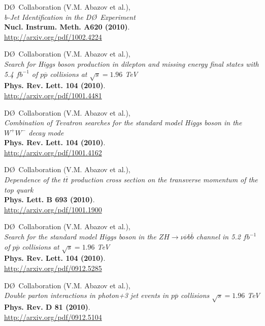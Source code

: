 \documentclass[12pt]{article}
\begin{document}
%
D\O~Collaboration (V.M. Abazov et al.), \\
\textsl{b-Jet Identification in the D\O~Experiment}\\
\textbf{Nucl. Instrum. Meth. A620 (2010)}.\\
{\small{\url{http://arxiv.org/pdf/1002.4224}}}\vspace{4mm}

%
D\O~Collaboration (V.M. Abazov et al.), \\
\textsl{Search for Higgs boson production in dilepton and missing energy final states with 5.4 $fb^{-1}$ of $p\overline{p}$ collisions at $\sqrt{s}=1.96$ TeV}\\
\textbf{Phys. Rev. Lett. 104 (2010)}.\\
{\small{\url{http://arxiv.org/pdf/1001.4481}}}\vspace{4mm}

%
D\O~Collaboration (V.M. Abazov et al.), \\
\textsl{Combination of Tevatron searches for the standard model Higgs boson in the $W^{+}W^{-}$ decay mode}\\
\textbf{Phys. Rev. Lett. 104 (2010)}.\\
{\small{\url{http://arxiv.org/pdf/1001.4162}}}\vspace{4mm}

%
D\O~Collaboration (V.M. Abazov et al.), \\
\textsl{Dependence of the $t\overline{t}$ production cross section on the transverse momentum of the top quark}\\
\textbf{Phys. Lett. B 693 (2010)}.\\
{\small{\url{http://arxiv.org/pdf/1001.1900}}}\vspace{4mm}

%
D\O~Collaboration (V.M. Abazov et al.), \\
\textsl{Search for the standard model Higgs boson in the $ZH\rightarrow \nu\overline{\nu}b\overline{b}$ channel in 5.2 $fb^{-1}$ of $p\overline{p}$ collisions at $\sqrt{s}=1.96$ TeV}\\
\textbf{Phys. Rev. Lett. 104 (2010)}.\\
{\small{\url{http://arxiv.org/pdf/0912.5285}}}\vspace{4mm}

%
D\O~Collaboration (V.M. Abazov et al.), \\
\textsl{Double parton interactions in photon+3 jet events in $p\overline{p}$ collisions $\sqrt{s}=1.96$ TeV}\\
\textbf{Phys. Rev. D 81 (2010)}.\\
{\small{\url{http://arxiv.org/pdf/0912.5104}}}\vspace{4mm}
\end{document}
